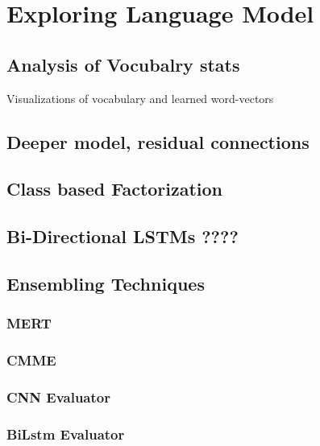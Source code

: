 \chapter{Exploring Language Model}
\label{chapter:langModel}
\section{Analysis of Vocubalry stats}
Visualizations of vocabulary and learned word-vectors
\section{Deeper model, residual connections }
\section{Class based Factorization}
\section{Bi-Directional LSTMs ????}
\section{Ensembling Techniques}
\subsection{MERT}
\subsection{CMME}
\subsection{CNN Evaluator}
\subsection{BiLstm Evaluator}
